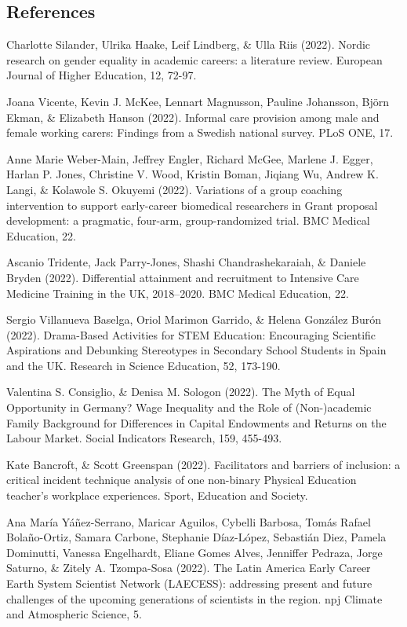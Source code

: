 \documentclass[runningheads]{llncs}
\begin{document}
\begin{multicols}{2}
[]
\section{References}
\scriptsize
Charlotte Silander, Ulrika Haake, Leif Lindberg, \& Ulla Riis (2022). Nordic research on gender equality in academic careers: a literature review. European Journal of Higher Education, 12, 72-97.

Joana Vicente, Kevin J. McKee, Lennart Magnusson, Pauline Johansson, Björn Ekman, \& Elizabeth Hanson (2022). Informal care provision among male and female working carers: Findings from a Swedish national survey. PLoS ONE, 17.

Anne Marie Weber-Main, Jeffrey Engler, Richard McGee, Marlene J. Egger, Harlan P. Jones, Christine V. Wood, Kristin Boman, Jiqiang Wu, Andrew K. Langi, \& Kolawole S. Okuyemi (2022). Variations of a group coaching intervention to support early-career biomedical researchers in Grant proposal development: a pragmatic, four-arm, group-randomized trial. BMC Medical Education, 22.

Ascanio Tridente, Jack Parry-Jones, Shashi Chandrashekaraiah, \& Daniele Bryden (2022). Differential attainment and recruitment to Intensive Care Medicine Training in the UK, 2018–2020. BMC Medical Education, 22.

Sergio Villanueva Baselga, Oriol Marimon Garrido, \& Helena González Burón (2022). Drama-Based Activities for STEM Education: Encouraging Scientific Aspirations and Debunking Stereotypes in Secondary School Students in Spain and the UK. Research in Science Education, 52, 173-190.

Valentina S. Consiglio, \& Denisa M. Sologon (2022). The Myth of Equal Opportunity in Germany? Wage Inequality and the Role of (Non-)academic Family Background for Differences in Capital Endowments and Returns on the Labour Market. Social Indicators Research, 159, 455-493.

Kate Bancroft, \& Scott Greenspan (2022). Facilitators and barriers of inclusion: a critical incident technique analysis of one non-binary Physical Education teacher’s workplace experiences. Sport, Education and Society.

Ana María Yáñez-Serrano, Maricar Aguilos, Cybelli Barbosa, Tomás Rafael Bolaño-Ortiz, Samara Carbone, Stephanie Díaz-López, Sebastián Diez, Pamela Dominutti, Vanessa Engelhardt, Eliane Gomes Alves, Jenniffer Pedraza, Jorge Saturno, \& Zitely A. Tzompa-Sosa (2022). The Latin America Early Career Earth System Scientist Network (LAECESS): addressing present and future challenges of the upcoming generations of scientists in the region. npj Climate and Atmospheric Science, 5.


\end{multicols}
\end{document}
